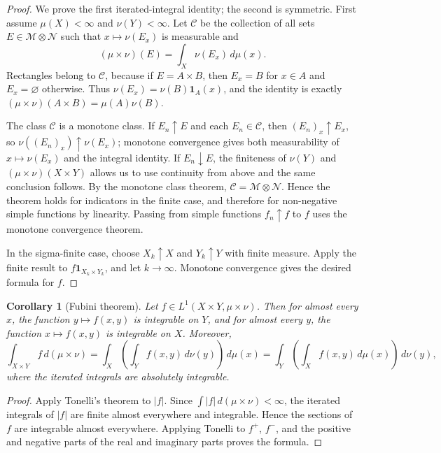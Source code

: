\documentclass[11pt,openany]{book}
\numberwithin{equation}{chapter}
\theoremstyle{definition}
\theoremstyle{plain}
\newtheorem{corollary}[definition]{Corollary}
\theoremstyle{remark}
\newcommand{\M}{\mathcal{M}}
\newcommand{\1}{\mathbf{1}}
\newcommand{\dd}{\,d}
\newcommand{\abs}[1]{\left\lvert #1\right\rvert}
\begin{document}
\begin{proof}
We prove the first iterated-integral identity; the second is symmetric. First assume \(\mu(X)<\infty\) and \(\nu(Y)<\infty\). Let \(\mathcal C\) be the collection of all sets \(E\in\M\otimes\mathcal N\) such that \(x\mapsto\nu(E_x)\) is measurable and
\[
  (\mu\times\nu)(E)=\int_X\nu(E_x)\dd\mu(x).
\]
Rectangles belong to \(\mathcal C\), because if \(E=A\times B\), then \(E_x=B\) for \(x\in A\) and \(E_x=\varnothing\) otherwise. Thus \(\nu(E_x)=\nu(B)\1_A(x)\), and the identity is exactly \((\mu\times\nu)(A\times B)=\mu(A)\nu(B)\).

The class \(\mathcal C\) is a monotone class. If \(E_n\uparrow E\) and each \(E_n\in\mathcal C\), then \((E_n)_x\uparrow E_x\), so \(\nu((E_n)_x)\uparrow\nu(E_x)\); monotone convergence gives both measurability of \(x\mapsto\nu(E_x)\) and the integral identity. If \(E_n\downarrow E\), the finiteness of \(\nu(Y)\) and \((\mu\times\nu)(X\times Y)\) allows us to use continuity from above and the same conclusion follows. By the monotone class theorem, \(\mathcal C=\M\otimes\mathcal N\). Hence the theorem holds for indicators in the finite case, and therefore for non-negative simple functions by linearity. Passing from simple functions \(f_n\uparrow f\) to \(f\) uses the monotone convergence theorem.

In the sigma-finite case, choose \(X_k\uparrow X\) and \(Y_k\uparrow Y\) with finite measure. Apply the finite result to \(f\1_{X_k\times Y_k}\), and let \(k\to\infty\). Monotone convergence gives the desired formula for \(f\).
\end{proof}

\begin{corollary}[Fubini theorem]
Let \(f\in L^1(X\times Y,\mu\times\nu)\). Then for almost every \(x\), the function \(y\mapsto f(x,y)\) is integrable on \(Y\), and for almost every \(y\), the function \(x\mapsto f(x,y)\) is integrable on \(X\). Moreover,
\[
  \int_{X\times Y}f\dd(\mu\times\nu)
  =\int_X\left(\int_Y f(x,y)\dd\nu(y)\right)\dd\mu(x)
  =\int_Y\left(\int_X f(x,y)\dd\mu(x)\right)\dd\nu(y),
\]
where the iterated integrals are absolutely integrable.
\end{corollary}

\begin{proof}
Apply Tonelli's theorem to \(\abs{f}\). Since \(\int\abs{f}\dd(\mu\times\nu)<\infty\), the iterated integrals of \(\abs{f}\) are finite almost everywhere and integrable. Hence the sections of \(f\) are integrable almost everywhere. Applying Tonelli to \(f^+\), \(f^-\), and the positive and negative parts of the real and imaginary parts proves the formula.
\end{proof}
\end{document}
